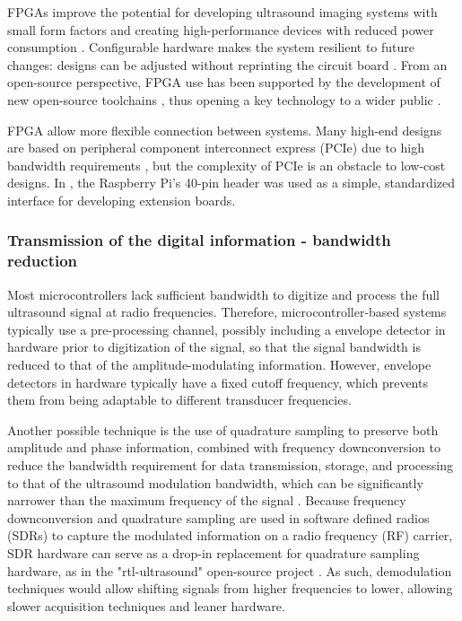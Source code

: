 \documentclass{article}
\begin{document}
FPGAs improve the potential for developing ultrasound imaging systems with small form factors and creating high-performance devices with reduced power consumption \cite{dusa_low_2014}. Configurable hardware makes the system resilient to future changes: designs can be adjusted without reprinting the circuit board \cite{zhang_fpga_2012, qiu_programmable_2010, ibrahim_single-fpga_2017}. From an open-source perspective, FPGA use has been supported by the development of new open-source toolchains \cite{shah_yosys+nextpnr:_2019}, thus opening a key technology to a wider public \cite{saiz-vela_low-cost_2020}.

FPGA allow more flexible connection between systems. Many high-end designs are based on peripheral component interconnect express (PCIe) due to high bandwidth requirements \cite{zimmermann_high_2018, lewandowski_low-cost_2012, kidav_architecture_2019}, but the complexity of PCIe is an obstacle to low-cost designs. In \cite{luc_jonveaux_un0rick_2019}, the Raspberry Pi's 40-pin header was used as a simple, standardized interface for developing extension boards. 

\subsubsection{Transmission of the digital information - bandwidth reduction}

Most microcontrollers lack sufficient bandwidth to digitize and process the full ultrasound signal at radio frequencies. Therefore, microcontroller-based systems typically use a pre-processing channel, possibly including a envelope detector in hardware prior to digitization of the signal, so that the signal bandwidth is reduced to that of the amplitude-modulating information. However, envelope detectors in hardware typically have a fixed cutoff frequency, which prevents them from being adaptable to different transducer frequencies.

Another possible technique is the use of quadrature sampling to preserve both amplitude and phase information, combined with frequency downconversion to reduce the bandwidth requirement for data transmission, storage, and processing to that of the ultrasound modulation bandwidth, which can be significantly narrower than the maximum frequency of the signal \cite{peyton_comparison_2018}. Because frequency downconversion and quadrature sampling are used in software defined radios (SDRs) \cite{hager_design_2019, hager_lightprobe:_2019} to capture the modulated information on a radio frequency (RF) carrier, SDR hardware can serve as a drop-in replacement for quadrature sampling hardware, as in the "rtl-ultrasound" open-source project \cite{meng_rtl-ultrasound_2019}.  As such, demodulation techniques would allow shifting signals from higher frequencies to lower, allowing slower acquisition techniques and leaner hardware. 
\end{document}
